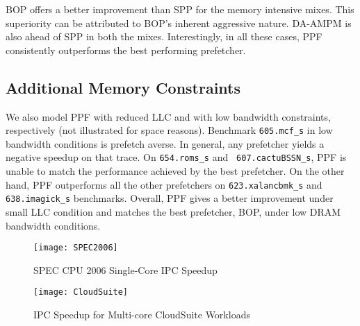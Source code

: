 BOP offers a better improvement than SPP for the memory intensive mixes. This
superiority can be attributed to BOP's inherent aggressive nature. DA-AMPM is
also ahead of SPP in both the mixes. Interestingly, in all these cases, PPF
consistently outperforms the best performing prefetcher.



\subsection{Additional Memory Constraints}
\label{Results-AdditionalMem}


We also model PPF with reduced LLC and with low bandwidth constraints,
respectively (not illustrated for space reasons). Benchmark {\tt 605.mcf\_s}
in low bandwidth conditions is prefetch averse. In general, any prefetcher
yields a negative speedup on that trace. On {\tt 654.roms\_s} and {\tt
607.cactuBSSN\_s}, PPF is unable to match the performance achieved by the best
prefetcher. On the other hand, PPF outperforms all the other prefetchers on
{\tt 623.xalancbmk\_s} and {\tt 638.imagick\_s} benchmarks. Overall, PPF
gives a better improvement under small LLC condition and matches the best
prefetcher, BOP, under low DRAM bandwidth conditions.

\begin{figure}[ht]
\texttt{[image: SPEC2006]}
\caption{SPEC CPU 2006 Single-Core IPC Speedup}
\label{Fig:SPEC2006_1core}
\end{figure}

\begin{figure}[ht]
\texttt{[image: CloudSuite]}
\caption{IPC Speedup for Multi-core CloudSuite Workloads}
\label{Fig:CloudSuite}
\end{figure}

